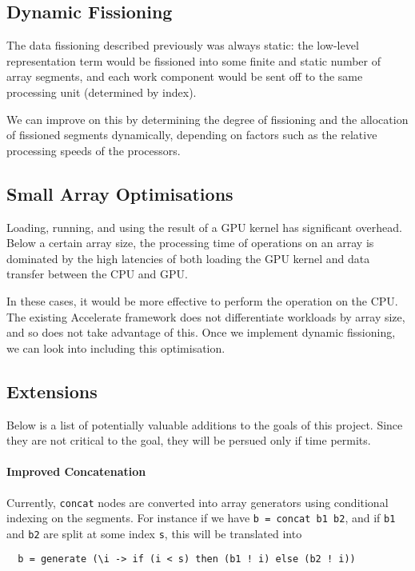 \documentclass[a4paper,12pt]{article}
\newcommand{\icf}[1]{\mbox{\texttt{#1}}} %
\begin{document}
\subsection{Dynamic Fissioning}
The data fissioning described previously was always static: the low-level representation term would be fissioned into some finite and static number of array segments, and each work component would be sent off to the same processing unit (determined by index).

We can improve on this by determining the degree of fissioning and the allocation of fissioned segments dynamically, depending on factors such as the relative processing speeds of the processors.

\subsection{Small Array Optimisations}
Loading, running, and using the result of a GPU kernel has significant overhead.
Below a certain array size, the processing time of operations on an array is dominated by the high latencies of both loading the GPU kernel and data transfer between the CPU and GPU.

In these cases, it would be more effective to perform the operation on the CPU.
The existing Accelerate framework does not differentiate workloads by array size, and so does not take advantage of this.
Once we implement dynamic fissioning, we can look into including this optimisation.

\subsection{Extensions}
Below is a list of potentially valuable additions to the goals of this project.
Since they are not critical to the goal, they will be persued only if time permits.

\paragraph*{Improved Concatenation}
Currently, \icf{concat} nodes are converted into array generators using conditional indexing on the segments.
For instance if we have \icf{b\ =\ concat\ b1\ b2}, and if \icf{b1} and \icf{b2} are split at some index \icf{s}, this will be translated into

\begin{verbatim}
  b = generate (\i -> if (i < s) then (b1 ! i) else (b2 ! i))
\end{verbatim}
\end{document}

